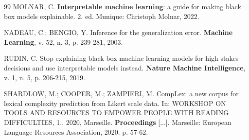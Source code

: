 \documentclass[12pt,a4paper]{article}
\begin{document}
\begin{thebibliography}{99}
MOLNAR, C. \textbf{Interpretable machine learning}: a guide for making black
box models explainable. 2. ed. Munique: Christoph Molnar, 2022.

NADEAU, C.; BENGIO, Y. Inference for the generalization error. \textbf{Machine
Learning}, v. 52, n. 3, p. 239-281, 2003.

RUDIN, C. Stop explaining black box machine learning models for high stakes
decisions and use interpretable models instead. \textbf{Nature Machine
Intelligence}, v. 1, n. 5, p. 206-215, 2019.

SHARDLOW, M.; COOPER, M.; ZAMPIERI, M. CompLex: a new corpus for lexical
complexity prediction from Likert scale data. In: WORKSHOP ON TOOLS AND
RESOURCES TO EMPOWER PEOPLE WITH READING DIFFICULTIES, 1., 2020, Marseille.
\textbf{Proceedings} [...]. Marseille: European Language Resources
Association, 2020. p. 57-62.

\end{thebibliography}
\end{document}

